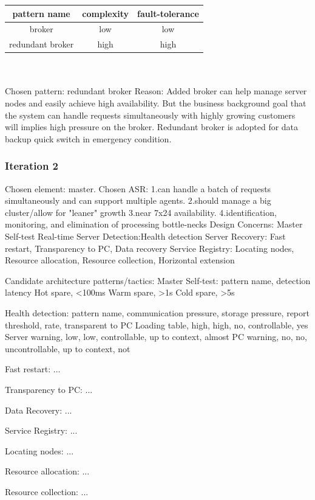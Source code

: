 \documentclass{article}
\begin{document}
		\begin{tabular}{|c|c|c|}
			\hline
			pattern name & complexity& fault-tolerance\\
			\hline
			broker& low& low\\
			\hline
			redundant broker& high& high\\
			\hline
		\end{tabular}
		\\\\
		Chosen pattern: redundant broker
		Reason: Added broker can help manage server nodes and easily achieve high availability. But the business background goal that the system can handle requests simultaneously with highly growing customers will implies high pressure on the broker. Redundant broker is adopted for data backup quick switch in emergency condition. 

		\subsubsection{Iteration 2}
		Chosen element: master.
		Chosen ASR: 
		1.can handle a batch of requests simultaneously and can support multiple agents.
		2.should manage a big cluster/allow for "leaner" growth
		3.near 7x24 availability.
		4.identification, monitoring, and elimination of processing bottle-necks
		Design Concerns:
		Master Self-test
		Real-time Server Detection:Health detection
		Server Recovery: Fast restart, Transparency to PC, Data recovery
		Service Registry: Locating nodes, Resource allocation, Resource collection, Horizontal extension

		Candidate architecture patterns/tactics:
		Master Self-test:
			pattern name, detection latency
			Hot spare, <100ms
			Warm spare, >1s
			Cold spare, >5s

		Health detection:
			pattern name, communication pressure, storage pressure, report threshold, rate, transparent to PC
			Loading table, high, high, no, controllable, yes 
			Server warning, low, low, controllable, up to context, almost
			PC warning, no, no, uncontrollable, up to context, not
		
		Fast restart:
			...
		
		Transparency to PC:
			...
		
		Data Recovery:
			...
		
		Service Registry:
			...
		
		Locating nodes:
			... 

		Resource allocation:
			...

		Resource collection:
			... 
\end{document}
